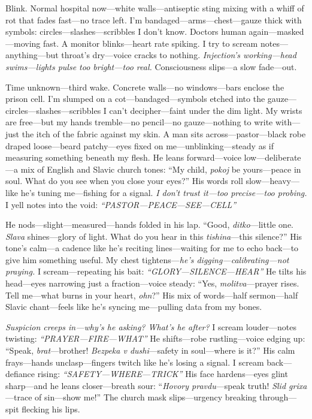 \documentclass{article}
\begin{document}
Blink. Normal hospital now—white walls—antiseptic sting mixing with a whiff of rot that fades fast—no trace left. I’m bandaged—arms—chest—gauze thick with symbols: circles—slashes—scribbles I don’t know. Doctors human again—masked—moving fast. A monitor blinks—heart rate spiking. I try to scream notes—anything—but throat’s dry—voice cracks to nothing. \textit{Injection’s working—head swims—lights pulse too bright—too real.} Consciousness slips—a slow fade—out.

Time unknown—third wake. Concrete walls—no windows—bars enclose the prison cell. I’m slumped on a cot—bandaged—symbols etched into the gauze—circles—slashes—scribbles I can’t decipher—faint under the dim light. My wrists are free—but my hands tremble—no pencil—no gauze—nothing to write with—just the itch of the fabric against my skin. A man sits across—pastor—black robe draped loose—beard patchy—eyes fixed on me—unblinking—steady as if measuring something beneath my flesh. He leans forward—voice low—deliberate—a mix of English and Slavic church tones: “My child, \textit{pokoj} be yours—peace in soul. What do you see when you close your eyes?” His words roll slow—heavy—like he’s tuning me—fishing for a signal. \textit{I don’t trust it—too precise—too probing.} I yell notes into the void: \textit{“PASTOR—PEACE—SEE—CELL”}

He nods—slight—measured—hands folded in his lap. “Good, \textit{ditko}—little one. \textit{Slava} shines—glory of light. What do you hear in this \textit{tishina}—this silence?” His tone’s calm—a cadence like he’s reciting lines—waiting for me to echo back—to give him something useful. My chest tightens—\textit{he’s digging—calibrating—not praying.} I scream—repeating his bait: \textit{“GLORY—SILENCE—HEAR”} He tilts his head—eyes narrowing just a fraction—voice steady: “Yes, \textit{molitva}—prayer rises. Tell me—what burns in your heart, \textit{ohn}?” His mix of words—half sermon—half Slavic chant—feels like he’s syncing me—pulling data from my bones.

\textit{Suspicion creeps in—why’s he asking? What’s he after?} I scream louder—notes twisting: \textit{“PRAYER—FIRE—WHAT”} He shifts—robe rustling—voice edging up: “Speak, \textit{brat}—brother! \textit{Bezpeka v dushi}—safety in soul—where is it?” His calm frays—hands unclasp—fingers twitch like he’s losing a signal. I scream back—defiance rising: \textit{“SAFETY—WHERE—TRICK”} His face hardens—eyes glint sharp—and he leans closer—breath sour: “\textit{Hovory pravdu}—speak truth! \textit{Slid grixa}—trace of sin—show me!” The church mask slips—urgency breaking through—spit flecking his lips.
\end{document}
